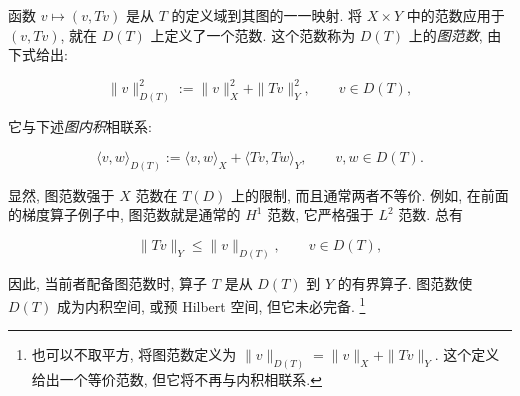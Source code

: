 {函数 $v\mapsto(v,Tv)$ 是从 $T$ 的定义域到其图的一一映射. 将 $X\times Y$ 中的范数应用于 $(v,Tv)$, 就在 $D(T)$ 上定义了一个范数. 这个范数称为 $D(T)$ 上的\emph{图范数}, 由下式给出:}

\[
\|v\|_{D(T)}^2:=\|v\|_X^2+\|Tv\|_Y^2,\qquad v\in D(T),
\]

{它与下述\emph{图内积}相联系:}

\[
\langle v,w\rangle_{D(T)}:=\langle v,w\rangle_X+\langle Tv,Tw\rangle_Y,\qquad v,w\in D(T).
\]

{显然, 图范数强于 $X$ 范数在 $T(D)$ 上的限制, 而且通常两者不等价. 例如, 在前面的梯度算子例子中, 图范数就是通常的 $H^1$ 范数, 它严格强于 $L^2$ 范数. 总有}

\[
\|Tv\|_Y\leq\|v\|_{D(T)},\qquad v\in D(T),
\]

{因此, 当前者配备图范数时, 算子 $T$ 是从 $D(T)$ 到 $Y$ 的有界算子. 图范数使 $D(T)$ 成为内积空间, 或预 Hilbert 空间, 但它未必完备.}%
\footnote{{也可以不取平方, 将图范数定义为 $\|v\|_{D(T)}=\|v\|_X+\|Tv\|_Y$. 这个定义给出一个等价范数, 但它将不再与内积相联系.}}
